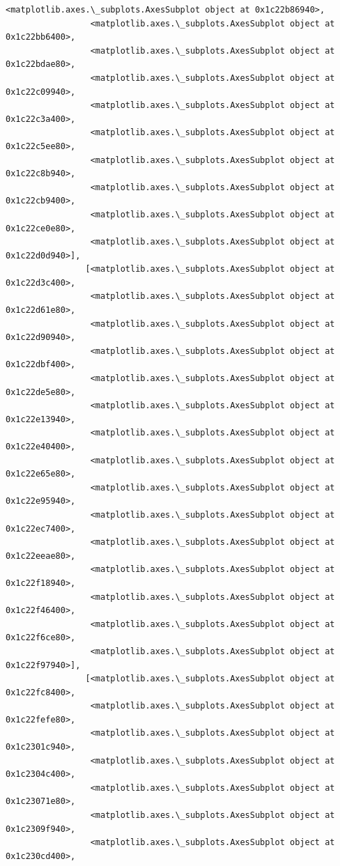 \documentclass[11pt]{article}
\begin{document}
\begin{Verbatim}[commandchars=\\\{\}]
                 <matplotlib.axes.\_subplots.AxesSubplot object at 0x1c22b86940>,
                 <matplotlib.axes.\_subplots.AxesSubplot object at 0x1c22bb6400>,
                 <matplotlib.axes.\_subplots.AxesSubplot object at 0x1c22bdae80>,
                 <matplotlib.axes.\_subplots.AxesSubplot object at 0x1c22c09940>,
                 <matplotlib.axes.\_subplots.AxesSubplot object at 0x1c22c3a400>,
                 <matplotlib.axes.\_subplots.AxesSubplot object at 0x1c22c5ee80>,
                 <matplotlib.axes.\_subplots.AxesSubplot object at 0x1c22c8b940>,
                 <matplotlib.axes.\_subplots.AxesSubplot object at 0x1c22cb9400>,
                 <matplotlib.axes.\_subplots.AxesSubplot object at 0x1c22ce0e80>,
                 <matplotlib.axes.\_subplots.AxesSubplot object at 0x1c22d0d940>],
                [<matplotlib.axes.\_subplots.AxesSubplot object at 0x1c22d3c400>,
                 <matplotlib.axes.\_subplots.AxesSubplot object at 0x1c22d61e80>,
                 <matplotlib.axes.\_subplots.AxesSubplot object at 0x1c22d90940>,
                 <matplotlib.axes.\_subplots.AxesSubplot object at 0x1c22dbf400>,
                 <matplotlib.axes.\_subplots.AxesSubplot object at 0x1c22de5e80>,
                 <matplotlib.axes.\_subplots.AxesSubplot object at 0x1c22e13940>,
                 <matplotlib.axes.\_subplots.AxesSubplot object at 0x1c22e40400>,
                 <matplotlib.axes.\_subplots.AxesSubplot object at 0x1c22e65e80>,
                 <matplotlib.axes.\_subplots.AxesSubplot object at 0x1c22e95940>,
                 <matplotlib.axes.\_subplots.AxesSubplot object at 0x1c22ec7400>,
                 <matplotlib.axes.\_subplots.AxesSubplot object at 0x1c22eeae80>,
                 <matplotlib.axes.\_subplots.AxesSubplot object at 0x1c22f18940>,
                 <matplotlib.axes.\_subplots.AxesSubplot object at 0x1c22f46400>,
                 <matplotlib.axes.\_subplots.AxesSubplot object at 0x1c22f6ce80>,
                 <matplotlib.axes.\_subplots.AxesSubplot object at 0x1c22f97940>],
                [<matplotlib.axes.\_subplots.AxesSubplot object at 0x1c22fc8400>,
                 <matplotlib.axes.\_subplots.AxesSubplot object at 0x1c22fefe80>,
                 <matplotlib.axes.\_subplots.AxesSubplot object at 0x1c2301c940>,
                 <matplotlib.axes.\_subplots.AxesSubplot object at 0x1c2304c400>,
                 <matplotlib.axes.\_subplots.AxesSubplot object at 0x1c23071e80>,
                 <matplotlib.axes.\_subplots.AxesSubplot object at 0x1c2309f940>,
                 <matplotlib.axes.\_subplots.AxesSubplot object at 0x1c230cd400>,

\end{Verbatim}
\end{document}
